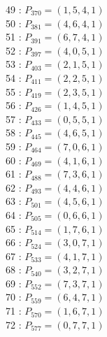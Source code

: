 \documentclass{article}
\begin{document}
{\begin{multicols}{3}
49 : $P_{370}=( 1, 5, 4, 1 )$\\
50 : $P_{381}=( 4, 6, 4, 1 )$\\
51 : $P_{391}=( 6, 7, 4, 1 )$\\
52 : $P_{397}=( 4, 0, 5, 1 )$\\
53 : $P_{403}=( 2, 1, 5, 1 )$\\
54 : $P_{411}=( 2, 2, 5, 1 )$\\
55 : $P_{419}=( 2, 3, 5, 1 )$\\
56 : $P_{426}=( 1, 4, 5, 1 )$\\
57 : $P_{433}=( 0, 5, 5, 1 )$\\
58 : $P_{445}=( 4, 6, 5, 1 )$\\
59 : $P_{464}=( 7, 0, 6, 1 )$\\
60 : $P_{469}=( 4, 1, 6, 1 )$\\
61 : $P_{488}=( 7, 3, 6, 1 )$\\
62 : $P_{493}=( 4, 4, 6, 1 )$\\
63 : $P_{501}=( 4, 5, 6, 1 )$\\
64 : $P_{505}=( 0, 6, 6, 1 )$\\
65 : $P_{514}=( 1, 7, 6, 1 )$\\
66 : $P_{524}=( 3, 0, 7, 1 )$\\
67 : $P_{533}=( 4, 1, 7, 1 )$\\
68 : $P_{540}=( 3, 2, 7, 1 )$\\
69 : $P_{552}=( 7, 3, 7, 1 )$\\
70 : $P_{559}=( 6, 4, 7, 1 )$\\
71 : $P_{570}=( 1, 6, 7, 1 )$\\
72 : $P_{577}=( 0, 7, 7, 1 )$\\
\end{multicols}


%


%


}%
\end{document}
